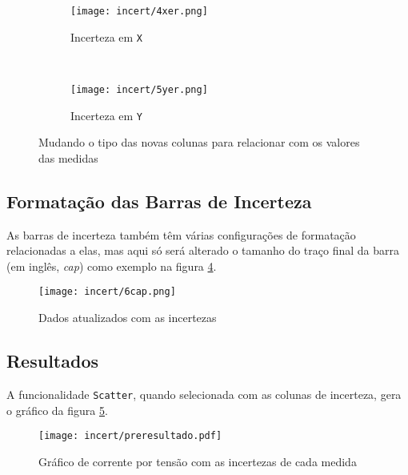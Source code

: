     \begin{figure}[htbp]
        \centering
        \begin{subfigure}{0.45\textwidth}
            \centering
            \texttt{[image: incert/4xer.png]}

            \caption{Incerteza em \texttt{X}}
            \label{fig:incert:xer}
        \end{subfigure}
        ~
        \begin{subfigure}{0.45\textwidth}
            \centering
            \texttt{[image: incert/5yer.png]}

            \caption{Incerteza em \texttt{Y}}
            \label{fig:incert:yer}
        \end{subfigure}
        \caption{Mudando o tipo das novas colunas para relacionar com os valores das medidas}
        \label{fig:incert:tipos}
    \end{figure}


\subsection{Formatação das Barras de Incerteza}

    As barras de incerteza também têm várias configurações de formatação relacionadas a elas, mas aqui só será alterado o tamanho do traço final da barra (em inglês, \textit{cap}) como exemplo na figura \ref{fig:incert:capsz}.

    \begin{figure}[htbp]
        \centering
        \texttt{[image: incert/6cap.png]}

        \caption{Dados atualizados com as incertezas}
        \label{fig:incert:capsz}
    \end{figure}


\subsection{Resultados}

    A funcionalidade \texttt{Scatter}, quando selecionada com as colunas de incerteza, gera o gráfico da figura \ref{fig:incert:preresultado}.

    \begin{figure}[htbp]
        \centering
        \texttt{[image: incert/preresultado.pdf]}

        \caption{Gráfico de corrente por tensão com as incertezas de cada medida}
        \label{fig:incert:preresultado}
    \end{figure}

